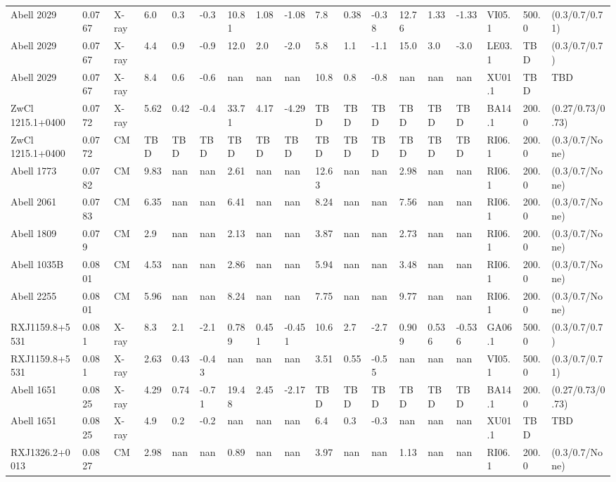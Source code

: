 \documentclass{article}
\begin{document}
\begin{center}
\begin{landscape}
\begin{longtable}{llllllllllllllllll}
Abell 2029 & 0.0767 & X-ray & 6.0 & 0.3 & -0.3 & 10.81 & 1.08 & -1.08 & 7.8 & 0.38 & -0.38 & 12.76 & 1.33 & -1.33 & VI05.1 & 500.0 & (0.3/0.7/0.71) \\
Abell 2029 & 0.0767 & X-ray & 4.4 & 0.9 & -0.9 & 12.0 & 2.0 & -2.0 & 5.8 & 1.1 & -1.1 & 15.0 & 3.0 & -3.0 & LE03.1 & TBD & (0.3/0.7/0.7) \\
Abell 2029 & 0.0767 & X-ray & 8.4 & 0.6 & -0.6 & nan & nan & nan & 10.8 & 0.8 & -0.8 & nan & nan & nan & XU01.1 & TBD & TBD \\
ZwCl 1215.1+0400 & 0.0772 & X-ray & 5.62 & 0.42 & -0.4 & 33.71 & 4.17 & -4.29 & TBD & TBD & TBD & TBD & TBD & TBD & BA14.1 & 200.0 & (0.27/0.73/0.73) \\
ZwCl 1215.1+0400 & 0.0772 & CM & TBD & TBD & TBD & TBD & TBD & TBD & TBD & TBD & TBD & TBD & TBD & TBD & RI06.1 & 200.0 & (0.3/0.7/None) \\
Abell 1773 & 0.0782 & CM & 9.83 & nan & nan & 2.61 & nan & nan & 12.63 & nan & nan & 2.98 & nan & nan & RI06.1 & 200.0 & (0.3/0.7/None) \\
Abell 2061 & 0.0783 & CM & 6.35 & nan & nan & 6.41 & nan & nan & 8.24 & nan & nan & 7.56 & nan & nan & RI06.1 & 200.0 & (0.3/0.7/None) \\
Abell 1809 & 0.079 & CM & 2.9 & nan & nan & 2.13 & nan & nan & 3.87 & nan & nan & 2.73 & nan & nan & RI06.1 & 200.0 & (0.3/0.7/None) \\
Abell 1035B & 0.0801 & CM & 4.53 & nan & nan & 2.86 & nan & nan & 5.94 & nan & nan & 3.48 & nan & nan & RI06.1 & 200.0 & (0.3/0.7/None) \\
Abell 2255 & 0.0801 & CM & 5.96 & nan & nan & 8.24 & nan & nan & 7.75 & nan & nan & 9.77 & nan & nan & RI06.1 & 200.0 & (0.3/0.7/None) \\
RXJ1159.8+5531 & 0.081 & X-ray & 8.3 & 2.1 & -2.1 & 0.789 & 0.451 & -0.451 & 10.6 & 2.7 & -2.7 & 0.909 & 0.536 & -0.536 & GA06.1 & 500.0 & (0.3/0.7/0.7) \\
RXJ1159.8+5531 & 0.081 & X-ray & 2.63 & 0.43 & -0.43 & nan & nan & nan & 3.51 & 0.55 & -0.55 & nan & nan & nan & VI05.1 & 500.0 & (0.3/0.7/0.71) \\
Abell 1651 & 0.0825 & X-ray & 4.29 & 0.74 & -0.71 & 19.48 & 2.45 & -2.17 & TBD & TBD & TBD & TBD & TBD & TBD & BA14.1 & 200.0 & (0.27/0.73/0.73) \\
Abell 1651 & 0.0825 & X-ray & 4.9 & 0.2 & -0.2 & nan & nan & nan & 6.4 & 0.3 & -0.3 & nan & nan & nan & XU01.1 & TBD & TBD \\
RXJ1326.2+0013 & 0.0827 & CM & 2.98 & nan & nan & 0.89 & nan & nan & 3.97 & nan & nan & 1.13 & nan & nan & RI06.1 & 200.0 & (0.3/0.7/None) \\

\end{longtable}
\end{landscape}
\end{center}
\end{document}
